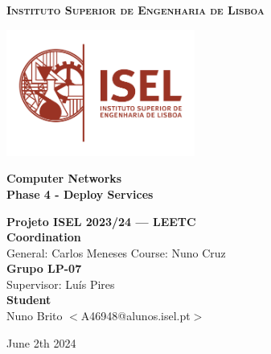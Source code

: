 \documentclass[11pt,a4paper]{report}
\newcommand{\school}{Instituto Superior de Engenharia de Lisboa}
\newcommand{\projisel}{Projeto ISEL 2023/24 --- LEETC}
\newcommand{\projtitle}{Computer Networks}
\newcommand{\projsubtitle}{Phase 4 - Deploy Services}
\newcommand{\projteam}{Grupo LP-07}
\begin{document}
    \setcounter{page}{1}

\begin{titlepage}
    \center

    \vspace*{-12mm}
    {\large \textbf{\textsc{\school}}}\\

    \vfill

    \includegraphics[width=62mm]{logoisel}
    
    \vfill
    
    {\huge \textbf{\projtitle}}\\[6mm]
    {\Large \textbf{\projsubtitle}}\\
    
    \vfill
    
    \vfill
    
    {\Large \textbf{\projisel}}\\[12mm]
    
    {\Large \textbf{Coordination}}\\[4mm]
    {\large General: Carlos Meneses\hspace*{18mm}
            Course: Nuno Cruz}\\[6mm]
    
    {\Large \textbf{\projteam}}\\[4mm]
    {\large Supervisor: Luís Pires\hspace*{12mm}}\\[6mm]
    
    {\Large \textbf{Student}}\\[4mm]
    {\large Nuno Brito $<$A46948@alunos.isel.pt$>$}
    
    \vspace*{10mm}
    
    \renewcommand{\today}{June 2th 2024}
    \today
    
\end{titlepage}

\tableofcontents
\end{document}

